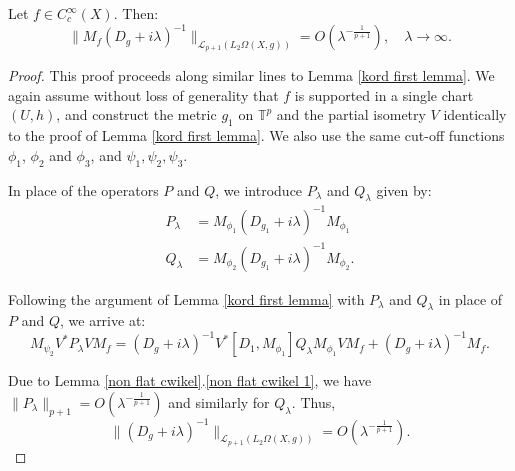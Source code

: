     \begin{lem}\label{kord second lemma} 
        Let $f\in C^{\infty}_c(X).$
        Then:
        \begin{equation*}
            \|M_f(D_g+i\lambda)^{-1}\|_{\mathcal{L}_{p+1}(L_2\Omega(X,g))} = O(\lambda^{-\frac{1}{p+1}}),\quad \lambda\to\infty.
        \end{equation*}
    \end{lem}
    \begin{proof} 
        This proof proceeds along similar lines to Lemma \ref{kord first lemma}. We again assume without loss of generality
        that $f$ is supported in a single chart $(U,h)$, and construct the metric $g_1$ on $\mathbb{T}^p$ and the partial isometry $V$ identically to the proof of Lemma \ref{kord first lemma}. We
        also use the same cut-off functions $\phi_1$, $\phi_2$ and $\phi_3$, and $\psi_1,\psi_2,\psi_3$.
        
        In place of the operators $P$ and $Q$, we introduce $P_{\lambda}$ and $Q_{\lambda}$ given by:
        \begin{align*}
            P_{\lambda} &= M_{\phi_1}(D_{g_1}+i\lambda)^{-1}M_{\phi_1}\\
            Q_{\lambda} &= M_{\phi_2}(D_{g_1}+i\lambda)^{-1}M_{\phi_2}.
        \end{align*}
        
        Following the argument of Lemma \ref{kord first lemma} with $P_{\lambda}$ and $Q_\lambda$ in place of $P$ and $Q$, we arrive at:
        \begin{equation*}
            M_{\psi_2}V^*P_{\lambda}VM_f = (D_g+i\lambda)^{-1}V^*[D_1,M_{\phi_1}]Q_{\lambda}M_{\phi_1}VM_f + (D_g+i\lambda)^{-1}M_f.
        \end{equation*}
        
        Due to Lemma \ref{non flat cwikel}.\eqref{non flat cwikel 1}, we have $\|P_\lambda\|_{p+1} = O(\lambda^{-\frac{1}{p+1}})$ and similarly for $Q_\lambda$. Thus,
        \begin{equation*}
            \|(D_g+i\lambda)^{-1}\|_{\mathcal{L}_{p+1}(L_2\Omega(X,g))} = O(\lambda^{-\frac{1}{p+1}}).
        \end{equation*}
    \end{proof}

